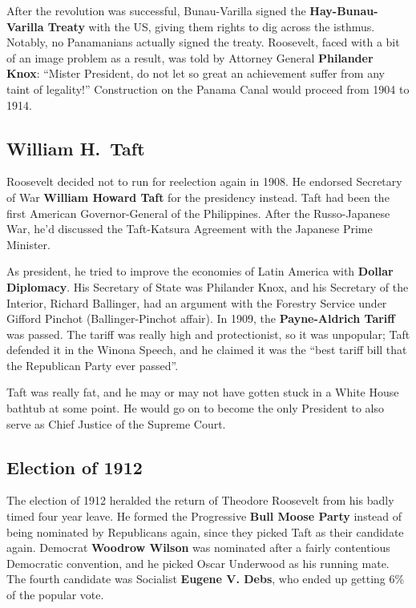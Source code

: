 After the revolution was successful,
Bunau-Varilla signed the \textbf{Hay-Bunau-Varilla Treaty} with the US, giving them rights to dig across the isthmus.
Notably, no Panamanians actually signed the treaty.
Roosevelt, faced with a bit of an image problem as a result,
was told by Attorney General \textbf{Philander Knox}:
``Mister President, do not let so great an achievement suffer from any taint of legality!''
Construction on the Panama Canal would proceed from 1904 to 1914.

\subsection*{William H.\ Taft}

Roosevelt decided not to run for reelection again in 1908.
He endorsed Secretary of War \textbf{William Howard Taft} for the presidency instead.
Taft had been the first American Governor-General of the Philippines.
After the Russo-Japanese War, he'd discussed the Taft-Katsura Agreement with the Japanese Prime Minister.

As president, he tried to improve the economies of Latin America with \textbf{Dollar Diplomacy}.
His Secretary of State was Philander Knox,
and his Secretary of the Interior, Richard Ballinger,
had an argument with the Forestry Service under Gifford Pinchot (Ballinger-Pinchot affair).
In 1909, the \textbf{Payne-Aldrich Tariff} was passed.
The tariff was really high and protectionist, so it was unpopular;
Taft defended it in the Winona Speech,
and he claimed it was the ``best tariff bill that the Republican Party ever passed''.

Taft was really fat, and he may or may not have gotten stuck in a White House bathtub at some point.
He would go on to become the only President to also serve as Chief Justice of the Supreme Court.

\subsection*{Election of 1912}

The election of 1912 heralded the return of Theodore Roosevelt from his badly timed four year leave.
He formed the Progressive \textbf{Bull Moose Party} instead of being nominated by Republicans again,
since they picked Taft as their candidate again.
Democrat \textbf{Woodrow Wilson} was nominated after a fairly contentious Democratic convention,
and he picked Oscar Underwood as his running mate.
The fourth candidate was Socialist \textbf{Eugene V. Debs}, who ended up getting 6\% of the popular vote.

